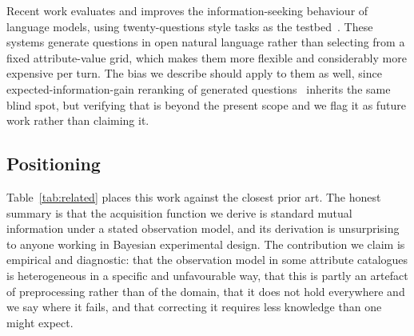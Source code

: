 Recent work evaluates and improves the information-seeking behaviour of
language models, using twenty-questions style tasks as the
testbed~\cite{debruyn2022,mazzaccara2024,hu2024uot}. These systems generate
questions in open natural language rather than selecting from a fixed
attribute-value grid, which makes them more flexible and considerably more
expensive per turn. The bias we describe should apply to them as well, since
expected-information-gain reranking of generated
questions~\cite{mazzaccara2024} inherits the same blind spot, but verifying
that is beyond the present scope and we flag it as future work rather than
claiming it.

\subsection{Positioning}

Table~\ref{tab:related} places this work against the closest prior art. The
honest summary is that the acquisition function we derive is standard mutual
information under a stated observation model, and its derivation is
unsurprising to anyone working in Bayesian experimental design. The
contribution we claim is empirical and diagnostic: that the observation model
in some attribute catalogues is heterogeneous in a specific and unfavourable
way, that this is partly an artefact of preprocessing rather than of the
domain, that it does not hold everywhere and we say where it fails, and that
correcting it requires less knowledge than one might expect.

